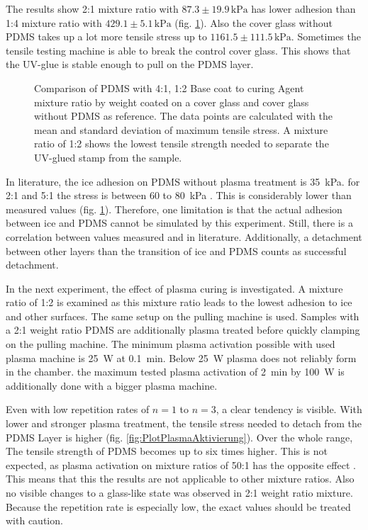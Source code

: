 The results show 2:1 mixture ratio with $87.3\pm19.9\,\si{\kilo\pascal}$ has lower adhesion than 1:4 mixture ratio with $429.1\pm5.1\,\si{\kilo\pascal}$ (fig. \ref{fig:vgl4:1zu1:2zuGlas}). Also the cover glass without PDMS takes up a lot more tensile stress up to $1161.5\pm111.5\,\si{\kilo\pascal}$. Sometimes the tensile testing machine is able to break the control cover glass. This shows that the UV-glue is stable enough to pull on the PDMS layer.


\begin{figure}[hbt!]
	\centering	
	
	\caption{Comparison of PDMS with 4:1, 1:2 Base coat to curing Agent mixture ratio by weight coated on a cover glass and cover glass without PDMS as reference. The data points are calculated with the mean and standard deviation of maximum tensile stress. A mixture ratio of 1:2 shows the lowest tensile strength needed to separate the UV-glued stamp from the sample.}
	\label{fig:vgl4:1zu1:2zuGlas}
\end{figure}


In literature, the ice adhesion on PDMS without plasma treatment is \SI{35}{\kilo\pascal}. for 2:1 and 5:1 the stress is between $60$ to \SI{80}{\kilo\pascal} \cite{IbanezIbanez.2022}. This is considerably lower than measured values (fig. \ref{fig:vgl4:1zu1:2zuGlas}). Therefore, one limitation is that the actual adhesion between ice and PDMS cannot be simulated by this experiment. Still, there is a correlation between values measured and in literature. Additionally, a detachment between other layers than the transition of ice and PDMS counts as successful detachment. 

In the next experiment, the effect of plasma curing is investigated. A mixture ratio of 1:2 is examined as this mixture ratio leads to the lowest adhesion to ice and other surfaces. The same setup on the pulling machine is used. Samples with a 2:1 weight ratio PDMS are additionally plasma treated before quickly clamping on the pulling machine. The minimum plasma activation possible with used plasma machine is 
\SI{25}{\watt} at \SI{0.1}{\minute}. Below \SI{25}{\watt} plasma does not reliably form in the chamber. the maximum tested plasma activation of \SI{2}{\minute} by \SI{100}{\watt} is additionally done with a bigger plasma machine.

Even with low repetition rates of $n=1$ to $n=3$, a clear tendency is visible. With lower and stronger plasma treatment, the tensile stress needed to detach from the PDMS Layer is higher (fig. \ref{fig:PlotPlasmaAktivierung}). Over the whole range, The tensile strength of PDMS becomes up to six times higher. This is not expected, as plasma activation on mixture ratios of 50:1 has the opposite effect \cite{Ohishi.2017}. This means that this the results are not applicable to other mixture ratios. Also no visible changes to a glass-like state was observed in 2:1 weight ratio mixture. Because the repetition rate is especially low, the exact values should be treated with caution. 

